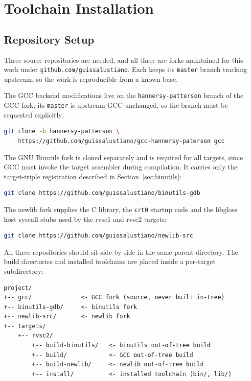 \section{Toolchain Installation}

\subsection{Repository Setup}

Three source repositories are needed, and all three are forks maintained for this work under
\nolinkurl{github.com/guissalustiano}. Each keeps its \texttt{master} branch tracking upstream, so
the work is reproducible from a known base.

The GCC backend modifications live on the \texttt{hannersy-patterson} branch of the GCC fork; its
\texttt{master} is upstream GCC unchanged, so the branch must be requested explicitly:

\begin{lstlisting}[language=bash]
git clone -b hannersy-patterson \
    https://github.com/guissalustiano/gcc-hannersy-paterson gcc
\end{lstlisting}

The GNU Binutils fork is cloned separately and is required for all targets, since GCC must invoke
the target assembler during compilation. It carries only the target-triple registration described
in Section~\ref{sec:binutils}:

\begin{lstlisting}[language=bash]
git clone https://github.com/guissalustiano/binutils-gdb
\end{lstlisting}

The newlib fork supplies the C library, the \texttt{crt0} startup code and the libgloss host
syscall stubs used by the rvsc1 and rvsc2 targets:

\begin{lstlisting}[language=bash]
git clone https://github.com/guissalustiano/newlib-src
\end{lstlisting}

All three repositories should sit side by side in the same parent directory. The build directories
and installed toolchains are placed inside a per-target subdirectory:

\begin{lstlisting}
project/
+-- gcc/              <- GCC fork (source, never built in-tree)
+-- binutils-gdb/     <- binutils fork
+-- newlib-src/       <- newlib fork
+-- targets/
    +-- rvsc2/
        +-- build-binutils/   <- binutils out-of-tree build
        +-- build/            <- GCC out-of-tree build
        +-- build-newlib/     <- newlib out-of-tree build
        +-- install/          <- installed toolchain (bin/, lib/)
\end{lstlisting}

